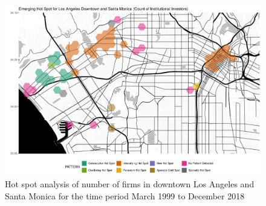 \begin{figure}
	\centering
	\includegraphics[width=1\linewidth]{Figures/ChapterIV/LA_Count_EH_Downtown}
	\caption[Hot Spot Analysis of Number of Firms in Downtown Los Angeles and Santa Monica 1999-2018]{Hot spot analysis of number of firms in downtown Los Angeles and Santa Monica for the time period March 1999 to December 2018}
	\label{fig:LAcounthotspot_Downtown}
\end{figure}


